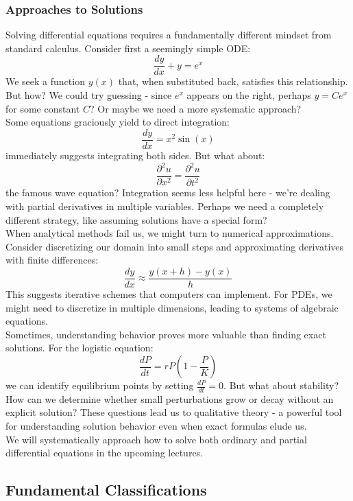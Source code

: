 \subsubsection*{Approaches to Solutions}

\noindent Solving differential equations requires a fundamentally different mindset from standard calculus. Consider first a seemingly simple ODE:
\[
\frac{dy}{dx} + y = e^x
\]
We seek a function $y(x)$ that, when substituted back, satisfies this relationship. But how? We could try guessing - since $e^x$ appears on the right, perhaps $y = Ce^x$ for some constant $C$? Or maybe we need a more systematic approach? \\

\noindent Some equations graciously yield to direct integration:
\[
\frac{dy}{dx} = x^2\sin(x)
\]
immediately suggests integrating both sides. But what about:
\[
\frac{\partial^2 u}{\partial x^2} = \frac{\partial^2 u}{\partial t^2}
\]
the famous wave equation? Integration seems less helpful here - we're dealing with partial derivatives in multiple variables. Perhaps we need a completely different strategy, like assuming solutions have a special form? \\

\noindent When analytical methods fail us, we might turn to numerical approximations. Consider discretizing our domain into small steps and approximating derivatives with finite differences:
\[
\frac{dy}{dx} \approx \frac{y(x + h) - y(x)}{h}
\]
This suggests iterative schemes that computers can implement. For PDEs, we might need to discretize in multiple dimensions, leading to systems of algebraic equations. \\

\noindent Sometimes, understanding behavior proves more valuable than finding exact solutions. For the logistic equation:
\[
\frac{dP}{dt} = rP\left(1 - \frac{P}{K}\right)
\]
we can identify equilibrium points by setting $\frac{dP}{dt} = 0$. But what about stability? How can we determine whether small perturbations grow or decay without an explicit solution? These questions lead us to qualitative theory - a powerful tool for understanding solution behavior even when exact formulas elude us. \\

\noindent We will systematically approach how to solve both ordinary and partial differential equations in the upcoming lectures.



\subsection*{Fundamental Classifications} 

